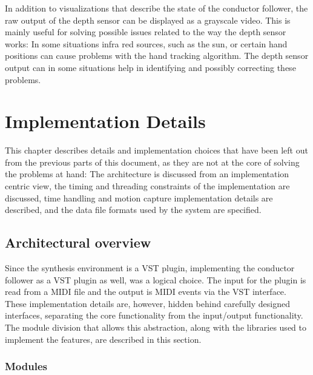 In addition to visualizations that describe
the state of the conductor follower,
the raw output of the depth sensor can be displayed
as a grayscale video.
This is mainly useful for solving possible issues
related to the way the depth sensor works:
In some situations infra red sources,
such as the sun,
or certain hand positions
can cause problems with the hand tracking algorithm.
The depth sensor output can in some situations help
in identifying and possibly correcting these problems.


\chapter{Implementation Details}
\label{chapter:implementation_details}

This chapter describes details and implementation choices
that have been left out from the previous parts of
this document,
as they are not at the core of solving the problems at hand:
The architecture is discussed from an implementation centric view,
the timing and threading constraints
of the implementation are discussed,
time handling and motion capture implementation details are described,
and the data file formats used by the system are specified.

\section{Architectural overview}

Since the synthesis environment is a VST plugin,
implementing the conductor follower as a VST plugin as well,
was a logical choice.
The input for the plugin is read from a MIDI file
and the output is MIDI events via the VST interface.
These implementation details are, however, hidden behind
carefully designed interfaces,
separating the core functionality from the input/output functionality.
The module division that allows this abstraction,
along with the libraries used to implement the features,
are described in this section.

\subsection{Modules}

